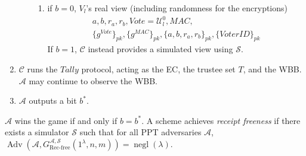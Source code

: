\documentclass[12pt,a4paper]{article}
\DeclareMathOperator{\negl}{\text{negl}}
\DeclareMathOperator{\Adv}{\text{Adv}}
\theoremstyle{definition}
\newcommand{\Vote}{\mathit{Vote}}
\newcommand{\VoterID}{\mathit{VoterID}}
\newcommand{\Mac}{\mathit{MAC}}
\newcounter{protocol}
\begin{document}
\begin{definition}
\begin{enumerate}
\begin{itemize}
\begin{enumerate}
                \item if $b=0$, $V_l$'s real view (including randomness for the encryptions)
                \begin{gather*}
                    a, b, r_a, r_b, \Vote=\mathcal{U}^0_l, \Mac,\\\{g^\Vote\}_{pk}, \{g^\Mac\}_{pk}, \{a,b,r_a,r_b\}_{pk},\{\VoterID\}_{pk}
                \end{gather*}
                If $b=1$, $\mathcal{C}$ instead provides a simulated view using $\mathcal{S}$.
            \end{enumerate}
        \end{itemize}
        \item $\mathcal{C}$ runs the $\mathit{Tally}$ protocol, acting as the EC, the trustee set $T$, and the WBB. $\mathcal{A}$ may continue to observe the WBB.
        \item $\mathcal{A}$ outputs a bit $b^*$.
    \end{enumerate}
    $\mathcal{A}$ wins the game if and only if $b=b^*$. A scheme achieves \textit{receipt freeness} if there exists a simulator $\mathcal{S}$ such that for all PPT adversaries $\mathcal{A}$, $\Adv\left(\mathcal{A}, G^{\mathcal{A},\mathcal{S}}_{\text{Rec-free}}(1^\lambda, n, m)\right)=\negl(\lambda)$.
\end{definition}
\end{document}
